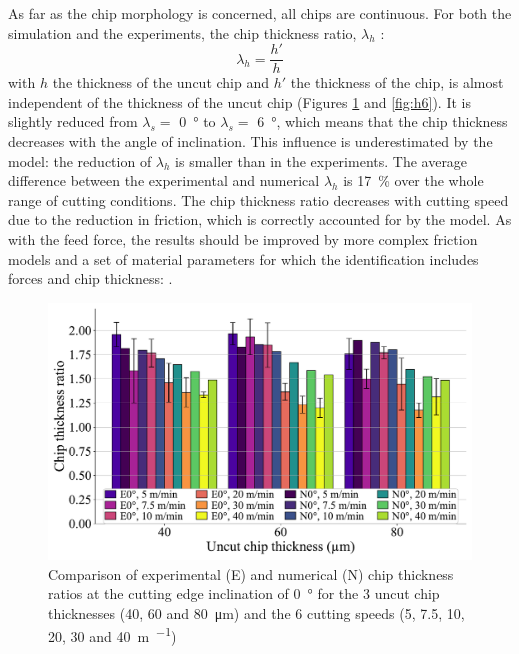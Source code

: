 \documentclass[preprint,12pt,times]{elsarticle}
\begin{document}
As far as the chip morphology is concerned, all chips are continuous. For both the simulation and the experiments, the chip thickness ratio, $\lambda_h$ :
%
\begin{equation}
\lambda_h = \frac{h'}{h}
\end{equation}
%
with $h$ the thickness of the uncut chip and $h'$ the thickness of the chip, is almost independent of the thickness of the uncut chip (Figures \ref{fig:h0} and \ref{fig:h6}). It is slightly reduced from $\lambda_s =$ \qty{0}{\degree} to $\lambda_s =$ \qty{6}{\degree}, which means that the chip thickness decreases with the angle of inclination. This influence is underestimated by the model: the reduction of $\lambda_h$ is smaller than in the experiments. The average difference between the experimental and numerical $\lambda_h$ is \qty{17}{\%} over the whole range of cutting conditions. The chip thickness ratio decreases with cutting speed due to the reduction in friction, which is correctly accounted for by the model. As with the feed force, the results should be improved by more complex friction models and a set of material parameters for which the identification includes forces and chip thickness: \cite{kugalurpalanisamy_Identification_2022}.

\begin{figure}[!h]
\centering
\includegraphics[width = 140 mm]{Figures/h0}
\caption{Comparison of experimental (E) and numerical (N) chip thickness ratios at the cutting edge inclination of \qty{0}{\degree} for the 3 uncut chip thicknesses (40, 60 and \qty{80}{\um}) and the 6 cutting speeds (5, 7.5, 10, 20, 30 and \qty{40}{\m\per\min})}
\label{fig:h0}
\end{figure}
\end{document}
